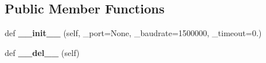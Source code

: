 \subsection*{Public Member Functions}
\begin{DoxyCompactItemize}
\item 
def {\bfseries \+\_\+\+\_\+init\+\_\+\+\_\+} (self, \+\_\+port=None, \+\_\+baudrate=1500000, \+\_\+timeout=0.)\hypertarget{classkondoServoLib_1_1b3mCtrl_1_1B3mClass_ab28360948b42d79f03158051877ca954}{}\label{classkondoServoLib_1_1b3mCtrl_1_1B3mClass_ab28360948b42d79f03158051877ca954}

\item 
def {\bfseries \+\_\+\+\_\+del\+\_\+\+\_\+} (self)\hypertarget{classkondoServoLib_1_1b3mCtrl_1_1B3mClass_aba9380d00c91d145ef00f13b9d7d76a7}{}\label{classkondoServoLib_1_1b3mCtrl_1_1B3mClass_aba9380d00c91d145ef00f13b9d7d76a7}


\end{DoxyCompactItemize}
